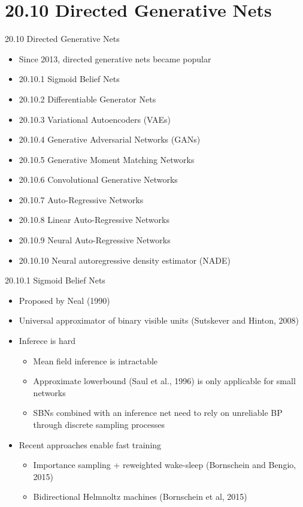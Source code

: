 \documentclass[dvipdfmx,presentation]{beamer}
\begin{document}
\section{20.10 Directed Generative Nets}
\label{sec:orgheadline43}
\begin{frame}[label={sec:orgheadline12}]{20.10 Directed Generative Nets}
\begin{itemize}
\item Since 2013, directed generative nets became popular
\item 20.10.1 Sigmoid Belief Nets
\item 20.10.2 Differentiable Generator Nets
\item 20.10.3 Variational Autoencoders (VAEs)
\item 20.10.4 Generative Adversarial Networks (GANs)
\item 20.10.5 Generative Moment Matching Networks
\item 20.10.6 Convolutional Generative Networks
\item 20.10.7 Auto-Regressive Networks
\item 20.10.8 Linear Auto-Regressive Networks
\item 20.10.9 Neural Auto-Regressive Networks
\item 20.10.10 Neural autoregressive density estimator (NADE)
\end{itemize}
\end{frame}
\begin{frame}[label={sec:orgheadline13}]{20.10.1 Sigmoid Belief Nets}
\begin{itemize}
\item Proposed by Neal (1990)
\item Universal approximator of binary visible units (Sutskever and Hinton, 2008)
\item Inferece is hard
\begin{itemize}
\item Mean field inference is intractable
\item Approximate lowerbound (Saul et al., 1996) is only applicable for small networks
\item SBNs combined with an inference net need to rely on unreliable BP through discrete sampling processes
\end{itemize}
\item Recent approaches enable fast training
\begin{itemize}
\item Importance sampling + reweighted wake-sleep (Bornschein and Bengio, 2015)
\item Bidirectional Helmnoltz machines (Bornschein et al, 2015)
\end{itemize}
\end{itemize}
\end{frame}
\end{document}
